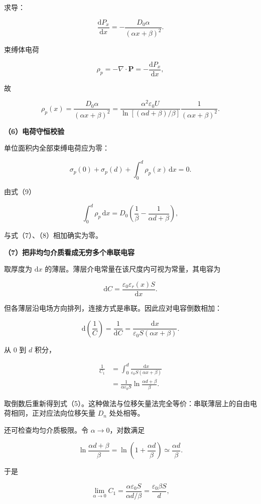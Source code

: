 \documentclass[12pt,a4paper,UTF8]{ctexart}
\begin{document}
求导：

\[
\frac{\mathrm dP_x}{\mathrm dx}
=-\frac{D_0\alpha}{(\alpha x+\beta)^2}.
\]

束缚体电荷

\[
\rho_p=-\nabla\cdot\bm P
=-\frac{\mathrm dP_x}{\mathrm dx},
\]

故

\[
\boxed{
\rho_p(x)
=\frac{D_0\alpha}{(\alpha x+\beta)^2}
=\frac{\alpha^2\varepsilon_0U}
{\ln[(\alpha d+\beta)/\beta]}
\frac1{(\alpha x+\beta)^2}
}.
\tag{9}
\]

\textbf{（6）电荷守恒校验}

单位面积内全部束缚电荷应为零：

\[
\sigma_p(0)+\sigma_p(d)+\int_0^d\rho_p(x)\,\mathrm dx=0.
\tag{10}
\]

由式（9）

\[
\int_0^d\rho_p\,\mathrm dx
=D_0\left(
\frac1\beta-\frac1{\alpha d+\beta}
\right),
\]

与式（7）、（8）相加确实为零。

\textbf{（7）把非均匀介质看成无穷多个串联电容}

取厚度为 \(\mathrm dx\)
的薄层。薄层介电常量在该尺度内可视为常量，其电容为

\[
\mathrm dC=\frac{\varepsilon_0\varepsilon_r(x)S}{\mathrm dx}.
\]

但各薄层沿电场方向排列，连接方式是串联。因此应对电容倒数相加：

\[
\mathrm d\!\left(\frac1C\right)
=\frac1{\mathrm dC}
=\frac{\mathrm dx}{\varepsilon_0S(\alpha x+\beta)}.
\tag{11}
\]

从 \(0\) 到 \(d\) 积分，

\[
\begin{aligned}
\frac1{C_1}
&=\int_0^d
\frac{\mathrm dx}{\varepsilon_0S(\alpha x+\beta)}\\
&=\frac1{\alpha\varepsilon_0S}
\ln\frac{\alpha d+\beta}{\beta}.
\end{aligned}
\]

取倒数后重新得到式（5）。这种做法与位移矢量法完全等价：串联薄层上的自由电荷相同，正对应法向位移矢量
\(D_n\) 处处相等。

还可检查均匀介质极限。令 \(\alpha\to0\)，对数满足

\[
\ln\frac{\alpha d+\beta}{\beta}
=\ln\left(1+\frac{\alpha d}{\beta}\right)
\simeq\frac{\alpha d}{\beta}.
\]

于是

\[
\lim_{\alpha\to0}C_1
=\frac{\alpha\varepsilon_0S}{\alpha d/\beta}
=\frac{\varepsilon_0\beta S}{d},
\tag{12}
\]
\end{document}
